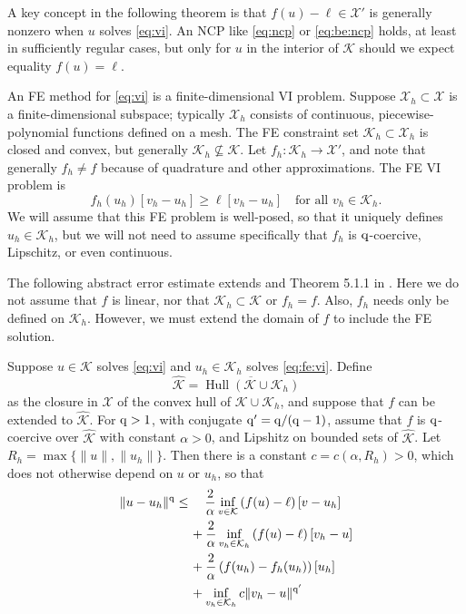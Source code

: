\documentclass[hidelinks,onefignum,onetabnum,final]{siamart220329}  %
\newcommand{\cK}{\mathcal{K}}
\newcommand{\cX}{\mathcal{X}}
\newcommand{\hcK}{\widehat{\cK}}
\newcommand{\qq}{{\text{\textnormal{q}}}}
\DeclareMathOperator*{\Hull}{Hull}
\begin{document}
A key concept in the following theorem is that $f(u)-\ell \in \cX'$ is generally nonzero when $u$ solves \eqref{eq:vi}.  An NCP like \eqref{eq:ncp} or \eqref{eq:be:ncp} holds, at least in sufficiently regular cases, but only for $u$ in the interior of $\cK$ should we expect equality $f(u)=\ell$.

An FE method for \eqref{eq:vi} is a finite-dimensional VI problem.  Suppose $\cX_h \subset \cX$ is a finite-dimensional subspace; typically $\cX_h$ consists of continuous, piecewise-polynomial functions defined on a mesh.  The FE constraint set $\cK_h\subset \cX_h$ is closed and convex, but generally $\cK_h \nsubseteq \cK$.  Let $f_h:\cK_h\to\cX'$, and note that generally $f_h\ne f$ because of quadrature and other approximations.  The FE VI problem is
\begin{equation}
f_h(u_h)[v_h-u_h] \ge \ell[v_h-u_h] \quad \text{for all } v_h\in \cK_h. \label{eq:fe:vi}
\end{equation}
We will assume that this FE problem is well-posed, so that it uniquely defines $u_h\in\cK_h$, but we will not need to assume specifically that $f_h$ is $\qq$-coercive, Lipschitz, or even continuous.

The following abstract error estimate extends \cite{Falk1974} and Theorem 5.1.1 in \cite{Ciarlet2002}.  Here we do not assume that $f$ is linear, nor that $\cK_h \subset \cK$ or $f_h=f$.  Also, $f_h$ needs only be defined on $\cK_h$.  However, we must extend the domain of $f$ to include the FE solution.

\begin{theorem} \label{thm:abstractestimate}  Suppose $u\in\cK$ solves \eqref{eq:vi} and $u_h\in\cK_h$ solves \eqref{eq:fe:vi}.  Define
\begin{equation}
\hcK = \overline{\Hull{(\cK \cup \cK_h)}}  \label{eq:convexhull}
\end{equation}
as the closure in $\cX$ of the convex hull of $\cK \cup \cK_h$, and suppose that $f$ can be extended to $\hcK$.  For $\qq>1$, with conjugate $\qq'=\qq/(\qq-1)$, assume that $f$ is $\qq$-coercive over $\hcK$ with constant $\alpha>0$, and Lipshitz on bounded sets of $\hcK$.  Let $R_h=\max\{\|u\|,\|u_h\|\}$.  Then there is a constant $c=c(\alpha,R_h)>0$, which does not otherwise depend on $u$ or $u_h$, so that
\begin{align}
\|u-u_h\|^\qq &\le \quad \frac{2}{\alpha} \inf_{v\in\cK} \left(f(u)-\ell\right)[v-u_h] \label{eq:abstractestimate} \\
   &\quad\, + \frac{2}{\alpha} \inf_{v_h\in\cK_h} \left(f(u)-\ell\right)[v_h-u] \notag \\
   &\quad\, + \frac{2}{\alpha} \left(f(u_h)-f_h(u_h)\right)[u_h] \notag \\
   &\quad\, + \inf_{v_h\in\cK_h} c \|v_h - u\|^{\qq'} \notag
\end{align}
\end{theorem}
\end{document}
